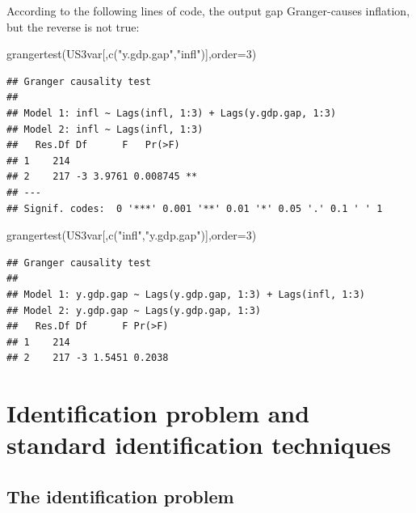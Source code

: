 \documentclass[
  12pt,
]{book}
\newenvironment{Shaded}{\begin{snugshade}}{\end{snugshade}}
\newcommand{\AttributeTok}[1]{\textcolor[rgb]{0.77,0.63,0.00}{#1}}
\newcommand{\DecValTok}[1]{\textcolor[rgb]{0.00,0.00,0.81}{#1}}
\newcommand{\FunctionTok}[1]{\textcolor[rgb]{0.00,0.00,0.00}{#1}}
\newcommand{\NormalTok}[1]{#1}
\newcommand{\StringTok}[1]{\textcolor[rgb]{0.31,0.60,0.02}{#1}}
\theoremstyle{definition}
\theoremstyle{definition}
\theoremstyle{definition}
\theoremstyle{definition}
\theoremstyle{remark}
\begin{document}
According to the following lines of code, the output gap Granger-causes inflation, but the reverse is not true:

\begin{Shaded}
\begin{Highlighting}[]
\FunctionTok{grangertest}\NormalTok{(US3var[,}\FunctionTok{c}\NormalTok{(}\StringTok{"y.gdp.gap"}\NormalTok{,}\StringTok{"infl"}\NormalTok{)],}\AttributeTok{order=}\DecValTok{3}\NormalTok{)}
\end{Highlighting}
\end{Shaded}

\begin{verbatim}
## Granger causality test
## 
## Model 1: infl ~ Lags(infl, 1:3) + Lags(y.gdp.gap, 1:3)
## Model 2: infl ~ Lags(infl, 1:3)
##   Res.Df Df      F   Pr(>F)   
## 1    214                      
## 2    217 -3 3.9761 0.008745 **
## ---
## Signif. codes:  0 '***' 0.001 '**' 0.01 '*' 0.05 '.' 0.1 ' ' 1
\end{verbatim}

\begin{Shaded}
\begin{Highlighting}[]
\FunctionTok{grangertest}\NormalTok{(US3var[,}\FunctionTok{c}\NormalTok{(}\StringTok{"infl"}\NormalTok{,}\StringTok{"y.gdp.gap"}\NormalTok{)],}\AttributeTok{order=}\DecValTok{3}\NormalTok{)}
\end{Highlighting}
\end{Shaded}

\begin{verbatim}
## Granger causality test
## 
## Model 1: y.gdp.gap ~ Lags(y.gdp.gap, 1:3) + Lags(infl, 1:3)
## Model 2: y.gdp.gap ~ Lags(y.gdp.gap, 1:3)
##   Res.Df Df      F Pr(>F)
## 1    214                 
## 2    217 -3 1.5451 0.2038
\end{verbatim}

\hypertarget{identifStruct}{%
\chapter{Identification problem and standard identification techniques}\label{identifStruct}}

\hypertarget{IdentifPbm}{%
\section{The identification problem}\label{IdentifPbm}}
\end{document}
